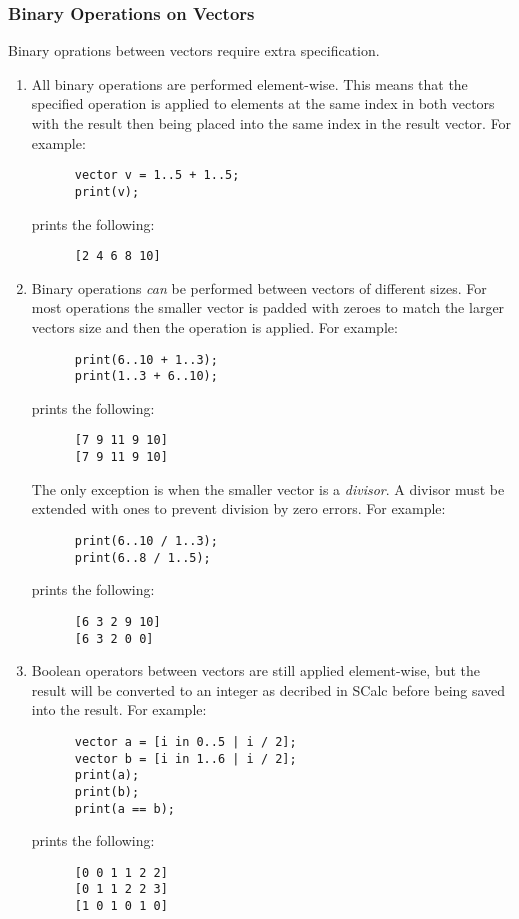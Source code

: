 \documentclass{article}
\begin{document}
\subsubsection{Binary Operations on Vectors}
Binary oprations between vectors require extra specification.
\begin{enumerate}
  \item
    All binary operations are performed element-wise. This means that the specified operation is
    applied to elements at the same index in both vectors with the result then being placed into the
    same index in the result vector. For example:
    \begin{lstlisting}
      vector v = 1..5 + 1..5;
      print(v);
    \end{lstlisting}

    prints the following:
    \begin{lstlisting}
      [2 4 6 8 10]
    \end{lstlisting}
  \item
    Binary operations \textit{can} be performed between vectors of different sizes. For most
    operations the smaller vector is padded with zeroes to match the larger vectors size and then
    the operation is applied.
    For example:
    \begin{lstlisting}
      print(6..10 + 1..3);
      print(1..3 + 6..10);
    \end{lstlisting}

    prints the following:
    \begin{lstlisting}
      [7 9 11 9 10]
      [7 9 11 9 10]
    \end{lstlisting}

    The only exception is when the smaller vector is a \textit{divisor}. A divisor must be extended
    with ones to prevent division by zero errors. For example:
    \begin{lstlisting}
      print(6..10 / 1..3);
      print(6..8 / 1..5);
    \end{lstlisting}

    prints the following:
    \begin{lstlisting}
      [6 3 2 9 10]
      [6 3 2 0 0]
    \end{lstlisting}
  \item
    Boolean operators between vectors are still applied element-wise, but the result will be
    converted to an integer as decribed in SCalc before being saved into the result. For example:
    \begin{lstlisting}
      vector a = [i in 0..5 | i / 2];
      vector b = [i in 1..6 | i / 2];
      print(a);
      print(b);
      print(a == b);
    \end{lstlisting}

    prints the following:
    \begin{lstlisting}
      [0 0 1 1 2 2]
      [0 1 1 2 2 3]
      [1 0 1 0 1 0]
    \end{lstlisting}
\end{enumerate}
\end{document}
